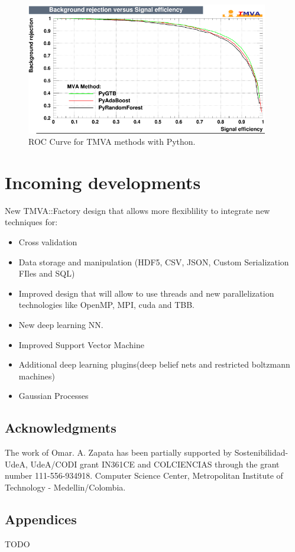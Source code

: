 \documentclass[a4paper]{jpconf}
\begin{document}
\begin{figure}[h]
\centering
\includegraphics[width=25pc]{img/pymvaroc.png}\caption{\label{pymvaroc} ROC Curve for TMVA methods with Python.}
\end{figure}


\section{Incoming developments}
New TMVA::Factory design that allows more flexiblility to
integrate new techniques for:
\begin{itemize}
\item Cross validation
\item Data storage and manipulation (HDF5, CSV, JSON,
Custom Serialization FIles and SQL)
\item Improved design that will allow to use threads and new
parallelization technologies like OpenMP, MPI, cuda and
TBB.
\item New deep learning NN.
\item Improved Support Vector Machine 
\item  Additional deep learning plugins(deep belief nets and
restricted boltzmann machines)
\item Gaussian Processes
\end{itemize}

\subsection{Acknowledgments}
The work of Omar. A. Zapata has been partially supported by Sostenibilidad-UdeA, UdeA/CODI grant IN361CE
and COLCIENCIAS through the grant number 111-556-934918.
Computer Science Center, Metropolitan Institute of Technology - Medellin/Colombia.


\subsection{Appendices}
TODO
\end{document}
